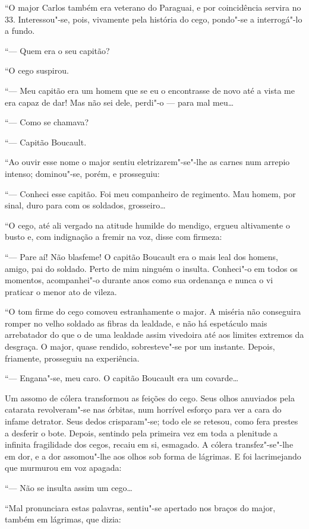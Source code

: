 ``O major Carlos também era veterano do Paraguai, e por coincidência
servira no 33. Interessou"-se, pois, vivamente pela história do cego,
pondo"-se a interrogá"-lo a fundo.

``--- Quem era o seu capitão?

``O cego suspirou.

``--- Meu capitão era um homem que se eu o encontrasse de novo até a
vista me era capaz de dar! Mas não sei dele, perdi"-o --- para mal meu\ldots{}

``--- Como se chamava?

``--- Capitão Boucault.

``Ao ouvir esse nome o major sentiu eletrizarem"-se"-lhe as carnes num
arrepio intenso; dominou"-se, porém, e prosseguiu:

``--- Conheci esse capitão. Foi meu companheiro de regimento. Mau homem,
por sinal, duro para com os soldados, grosseiro\ldots{}

``O cego, até ali vergado na atitude humilde do mendigo, ergueu
altivamente o busto e, com indignação a fremir na voz, disse com
firmeza:

``--- Pare aí! Não blasfeme! O capitão Boucault era o mais leal dos
homens, amigo, pai do soldado. Perto de mim ninguém o insulta. Conheci"-o
em todos os momentos, acompanhei"-o durante anos como sua ordenança e
nunca o vi praticar o menor ato de vileza.

``O tom firme do cego comoveu estranhamente o major. A miséria não
conseguira romper no velho soldado as fibras da lealdade, e não há
espetáculo mais arrebatador do que o de uma lealdade assim vivedoira até
aos limites extremos da desgraça. O major, quase rendido, sobresteve"-se
por um instante. Depois, friamente, prosseguiu na experiência.

``--- Engana"-se, meu caro. O capitão Boucault era um covarde\ldots{}

Um assomo de cólera transformou as feições do cego. Seus olhos anuviados
pela catarata revolveram"-se nas órbitas, num horrível esforço para ver a
cara do infame detrator. Seus dedos crisparam"-se; todo ele se retesou,
como fera prestes a desferir o bote. Depois, sentindo pela primeira vez
em toda a plenitude a infinita fragilidade dos cegos, recaiu em si,
esmagado. A cólera transfez"-se"-lhe em dor, e a dor assomou"-lhe aos olhos
sob forma de lágrimas. E foi lacrimejando que murmurou em voz apagada:

``--- Não se insulta assim um cego\ldots{}

``Mal pronunciara estas palavras, sentiu"-se apertado nos braços do
major, também em lágrimas, que dizia:

